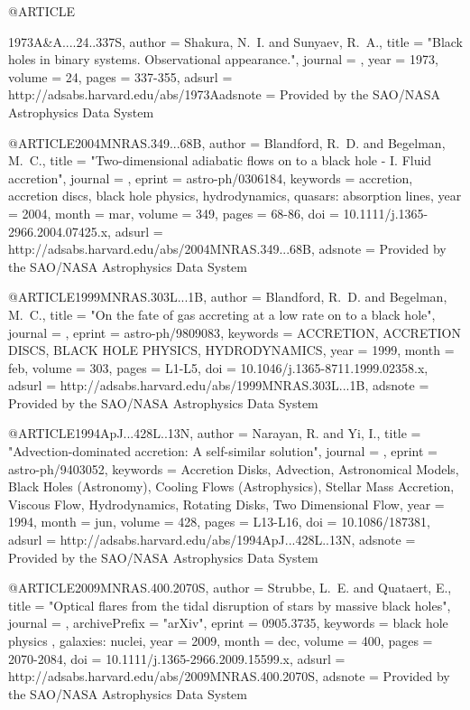 \documentclass[twocolumn,tighten]{aastex63}
\begin{document}
{{{{@ARTICLE{1973A&A....24..337S,
   author = {{Shakura}, N.~I. and {Sunyaev}, R.~A.},
    title = "{Black holes in binary systems. Observational appearance.}",
  journal = {\aap},
     year = 1973,
   volume = 24,
    pages = {337-355},
   adsurl = {http://adsabs.harvard.edu/abs/1973Aadsnote = {Provided by the SAO/NASA Astrophysics Data System}
}

@ARTICLE{2004MNRAS.349...68B,
   author = {{Blandford}, R.~D. and {Begelman}, M.~C.},
    title = "{Two-dimensional adiabatic flows on to a black hole - I. Fluid accretion}",
  journal = {\mnras},
   eprint = {astro-ph/0306184},
 keywords = {accretion, accretion discs, black hole physics, hydrodynamics, quasars: absorption lines},
     year = 2004,
    month = mar,
   volume = 349,
    pages = {68-86},
      doi = {10.1111/j.1365-2966.2004.07425.x},
   adsurl = {http://adsabs.harvard.edu/abs/2004MNRAS.349...68B},
  adsnote = {Provided by the SAO/NASA Astrophysics Data System}
}

@ARTICLE{1999MNRAS.303L...1B,
   author = {{Blandford}, R.~D. and {Begelman}, M.~C.},
    title = "{On the fate of gas accreting at a low rate on to a black hole}",
  journal = {\mnras},
   eprint = {astro-ph/9809083},
 keywords = {ACCRETION, ACCRETION DISCS, BLACK HOLE PHYSICS, HYDRODYNAMICS},
     year = 1999,
    month = feb,
   volume = 303,
    pages = {L1-L5},
      doi = {10.1046/j.1365-8711.1999.02358.x},
   adsurl = {http://adsabs.harvard.edu/abs/1999MNRAS.303L...1B},
  adsnote = {Provided by the SAO/NASA Astrophysics Data System}
}

@ARTICLE{1994ApJ...428L..13N,
   author = {{Narayan}, R. and {Yi}, I.},
    title = "{Advection-dominated accretion: A self-similar solution}",
  journal = {\apjl},
   eprint = {astro-ph/9403052},
 keywords = {Accretion Disks, Advection, Astronomical Models, Black Holes (Astronomy), Cooling Flows (Astrophysics), Stellar Mass Accretion, Viscous Flow, Hydrodynamics, Rotating Disks, Two Dimensional Flow},
     year = 1994,
    month = jun,
   volume = 428,
    pages = {L13-L16},
      doi = {10.1086/187381},
   adsurl = {http://adsabs.harvard.edu/abs/1994ApJ...428L..13N},
  adsnote = {Provided by the SAO/NASA Astrophysics Data System}
}

@ARTICLE{2009MNRAS.400.2070S,
   author = {{Strubbe}, L.~E. and {Quataert}, E.},
    title = "{Optical flares from the tidal disruption of stars by massive black holes}",
  journal = {\mnras},
archivePrefix = "arXiv",
   eprint = {0905.3735},
 keywords = {black hole physics , galaxies: nuclei},
     year = 2009,
    month = dec,
   volume = 400,
    pages = {2070-2084},
      doi = {10.1111/j.1365-2966.2009.15599.x},
   adsurl = {http://adsabs.harvard.edu/abs/2009MNRAS.400.2070S},
  adsnote = {Provided by the SAO/NASA Astrophysics Data System}
}

}}}}}
\end{document}

